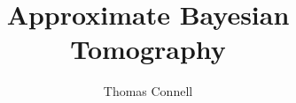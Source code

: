\documentclass[mres, greychapternumbers]{mqthesis}
\begin{document}
\frontmatter

\title{Approximate Bayesian Tomography} %
\author{Thomas Connell} %

\titlepage


\linespread{1}\selectfont
\tableofcontents 
\listoffigures
\listoftables

\mainmatter

\makeatletter
\let\old@makechapterhead\@makechapterhead
\makeatletter
\def\thickhrulefill{\leavevmode \leaders \hrule height 1ex \hfill \kern \z@}
\def\@makechapterhead#1{%
  {\parindent \z@ \raggedright
    \reset@font
    \hrule
    \vspace*{10\p@}%
    \par
    \iftoggle{smallcapschapter}{  %
   	 \Large \sc \@chapapp{} \Huge\bfseries \thechapter
	}{
	\Large \@chapapp{} \Huge\bfseries \thechapter
	}
    \par\nobreak
    \vspace*{10\p@}%
    \hrule
    \par
    \vspace*{1\p@}%
    \hrule
    \vspace*{20\p@}
    \Huge \bfseries #1\par\nobreak
    \vskip 20\p@
  }}

\linespread{1.3}\selectfont
\end{document}
